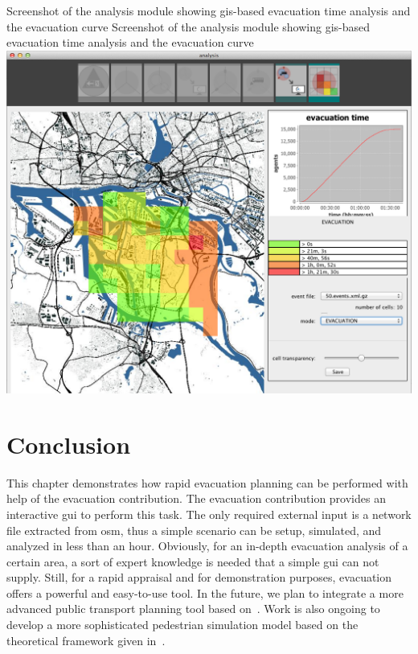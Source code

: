 \createfigure%
{Screenshot of the analysis module showing \protect\gls{gis}-based evacuation time analysis and the evacuation curve}%
{Screenshot of the analysis module showing \protect\gls{gis}-based evacuation time analysis and the evacuation curve}%
{\label{chap:evac:fig:analysis}}%
{\includegraphics[width=1\textwidth]{extending/figures/Evacuation/it50_evac_time}}
{}

\section{Conclusion}
\label{grips:outlook}
This chapter demonstrates how rapid evacuation planning can be performed with help of the evacuation contribution. The evacuation contribution provides an interactive \gls{gui} to perform this task.
The only required external input is a network file extracted from \gls{osm}, thus a simple scenario can be setup, simulated, and analyzed in less than an hour. Obviously, for an in-depth evacuation analysis of a certain area, a sort of expert knowledge is needed that a simple \gls{gui} can not supply. Still, for a rapid appraisal and for demonstration purposes, evacuation offers a powerful and easy-to-use tool. In the future, we plan to integrate a more advanced public transport planning tool based on~\citet{Neumann2014PhD}. Work is also ongoing to develop a more sophisticated pedestrian simulation model based on the theoretical framework given in~\citet{00FloetteroedLaemmel2014BiPedFnd}.

